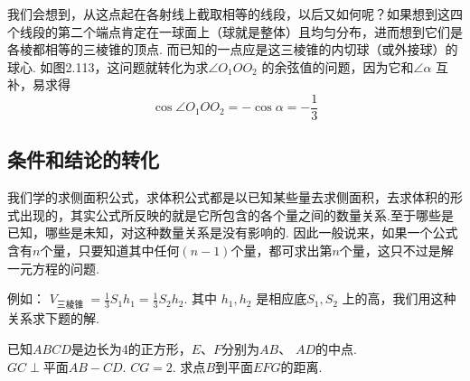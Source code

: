 \noindent
\begin{minipage}{.35\textwidth}
     \centering
{}
\end{minipage}\hfill
\begin{minipage}{.6\textwidth}
\CTEXindent 
我们会想到，从这点起在各射线上截取相等的线段，以后又如何呢？如果想到这四个线段的第二个端点肯定在一球面上（球就是整体）且均匀分布，进而想到它们是各棱都相等的三棱锥的顶点. 而已知的一点应是这三棱锥的内切球（或外接球）的球心. 如图2.113，这问题就转化为求$\angle O_{1}OO_{2}$ 的余弦值的问题，因为它和$\angle \alpha$ 互补，易求得
\[
\cos\angle O_{1}OO_{2}=-\cos\alpha =-\frac{1}{3}\]
\end{minipage}


\subsection*{条件和结论的转化}

我们学的求侧面积公式，求体积公式都是以已知某些量去求侧面积，去求体积的形式出现的，其实公式所反映的就是它所包含的各个量之间的数量关系.至于哪些是已知，哪些是未知，对这种数量关系是没有影响的. 因此一般说来，如果一个公式含有$n$个量，只要知道其中任何$(n-1)$个量，都可求出第$n$个量，这只不过是解一元方程的问题.

例如： $V_{\text{三棱锥 }}=\frac{1}{3}S_{1}h_{1}=\frac{1}{3}S_{2}h_{2}$. 其中 $h_{1},h_{2}$ 是相应底$S_{1},  S_{2}$ 上的高，我们用这种关系求下题的解.

已知$ABCD$是边长为4的正方形，$E$、$F$分别为$AB$、 $AD$的中点. $GC\perp \text{平面} AB-CD$. $CG=2$. 求点$B$到平面$EFG$的距离.

\begin{figure}[htp]
    \centering
{}
    \caption{}
\end{figure}




